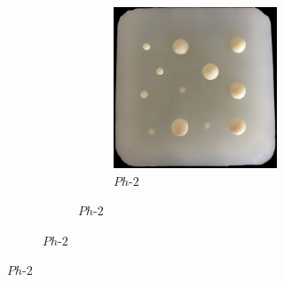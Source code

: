 \begin{figure}[]
\begin{subfigure}[b]{0.53\textwidth}
\begin{subfigure}[b]{\textwidth}
\begin{subfigure}[b]{.46\textwidth}
				\includegraphics[width=\textwidth]{./figs/ph2.jpg}
				\caption{$Ph\text{-}2$}
				\label{ph2}
			\end{subfigure}
		\end{subfigure}
		

\end{subfigure}
\end{figure}
